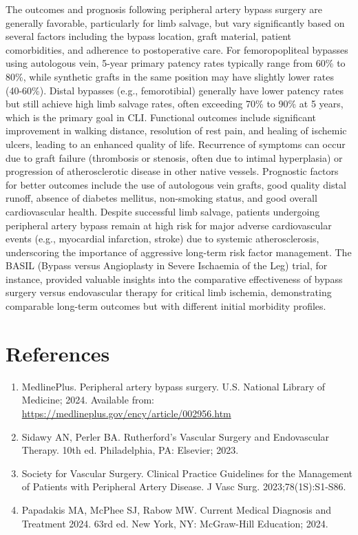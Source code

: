 The outcomes and prognosis following peripheral artery bypass surgery are generally favorable, particularly for limb salvage, but vary significantly based on several factors including the bypass location, graft material, patient comorbidities, and adherence to postoperative care. For femoropopliteal bypasses using autologous vein, 5-year primary patency rates typically range from 60\% to 80\%, while synthetic grafts in the same position may have slightly lower rates (40-60\%). Distal bypasses (e.g., femorotibial) generally have lower patency rates but still achieve high limb salvage rates, often exceeding 70\% to 90\% at 5 years, which is the primary goal in CLI. Functional outcomes include significant improvement in walking distance, resolution of rest pain, and healing of ischemic ulcers, leading to an enhanced quality of life. Recurrence of symptoms can occur due to graft failure (thrombosis or stenosis, often due to intimal hyperplasia) or progression of atherosclerotic disease in other native vessels. Prognostic factors for better outcomes include the use of autologous vein grafts, good quality distal runoff, absence of diabetes mellitus, non-smoking status, and good overall cardiovascular health. Despite successful limb salvage, patients undergoing peripheral artery bypass remain at high risk for major adverse cardiovascular events (e.g., myocardial infarction, stroke) due to systemic atherosclerosis, underscoring the importance of aggressive long-term risk factor management. The BASIL (Bypass versus Angioplasty in Severe Ischaemia of the Leg) trial, for instance, provided valuable insights into the comparative effectiveness of bypass surgery versus endovascular therapy for critical limb ischemia, demonstrating comparable long-term outcomes but with different initial morbidity profiles.

\section*{References}
\begin{enumerate}
  \item MedlinePlus. Peripheral artery bypass surgery. U.S. National Library of Medicine; 2024. Available from: \url{https://medlineplus.gov/ency/article/002956.htm}
  
  \item Sidawy AN, Perler BA. Rutherford's Vascular Surgery and Endovascular Therapy. 10th ed. Philadelphia, PA: Elsevier; 2023.
  
  \item Society for Vascular Surgery. Clinical Practice Guidelines for the Management of Patients with Peripheral Artery Disease. J Vasc Surg. 2023;78(1S):S1-S86.
  
  \item Papadakis MA, McPhee SJ, Rabow MW. Current Medical Diagnosis and Treatment 2024. 63rd ed. New York, NY: McGraw-Hill Education; 2024.
\end{enumerate}

\clearpage
